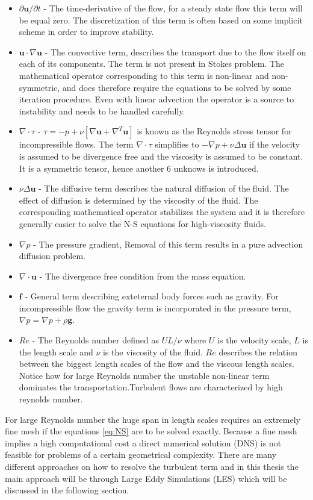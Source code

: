 \begin{itemize}
    \item $\partial \mathbf{u} /\partial t$
     - The time-derivative of the flow, for a steady state flow this term will be equal zero.
             The discretization of this term is often based on some implicit scheme in order to improve stability.  
    \item $\mathbf{u} \cdot \nabla \mathbf{u}$
     - The convective term, describes the transport due to the flow itself on each of its components. 
    The term is not present in Stokes problem.
    The mathematical operator corresponding to this term is non-linear and non-symmetric, and does therefore require the equations to be solved 
    by some iteration procedure. Even with linear advection the operator is a source to instability and needs to be handled carefully. 
\item  $\nabla \cdot \tau$ 
       - $\tau= -p + \nu[ \nabla \mathbf{u} + \nabla^T \mathbf{u}]$ is known as the Reynolds stress tensor for incompressible flows.
       The term $\nabla \cdot \tau$ simplifies to $-\nabla p + \nu \Delta \mathbf{u}$ if the velocity is assumed to 
       be divergence free and the viscosity is assumed to be constant. 
       It is a symmetric tensor, hence another 6 unknows is introduced.
    \item $\nu \Delta \mathbf{u}$ 
    - The diffusive term describes the natural diffusion of the fluid. The effect of diffusion is determined by the 
    viscosity of the fluid. The corresponding mathematical operator stabilizes the system and it is therefore generally easier
    to solve the N-S equations for high-viscosity fluids. 
    \item $\nabla p$
    - The pressure gradient, Removal of this term results in a pure advection diffusion problem.
    \item $\nabla \cdot \mathbf{u}$ 
    - The divergence free condition from the mass equation.
\item $\mathbf{f}$ 
    - General term describing exteternal body forces such as gravity. For incompressible flow the
    gravity term is incorporated in the pressure term, $\nabla p = \nabla p + \rho \mathbf{g}$. 
    \item $Re$ 
    - The Reynolds number defined as $UL/\nu$ where $U$ is the velocity scale, $L$ is the length scale and $\nu$ 
      is the viscosity of the fluid. $Re$ describes the relation between the biggest length scales of the flow
      and the viscous length scales. Notice how for large Reynolds number the unstable non-linear term 
      dominates the transportation.Turbulent flows are characterized by high reynolds number.
\end{itemize}
For large Reynolds number the huge span in length scales requires an extremely fine mesh if the equations \ref{eq:NS} 
are to be solved exactly. Because a fine mesh implies a high computational cost a direct numerical solution (DNS) is not feasible for 
problems of a certain geometrical complexity. There are many different approaches on how to resolve the turbulent term and in 
this thesis the main approach will be through Large Eddy Simulations (LES) which will be discussed 
in the following section.
%
